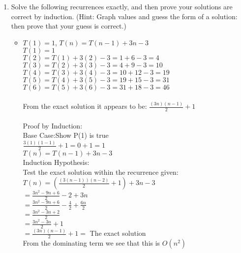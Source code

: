 \documentclass[11pt]{article}
\begin{document}
\begin{enumerate}
\item  Solve the following recurrences exactly, and then prove your solutions are correct by induction. (Hint:
Graph values and guess the form of a solution: then prove that your guess is correct.)
\begin {itemize}
\item $T(1) = 1$, $T(n) = T(n-1) + 3n-3$\\
$T(1) = 1$\\
$T(2) = T(1) +3(2)-3 = 1+6-3= 4$\\
$T(3) = T(2) + 3(3)-3=4+9-3=10$\\
$T(4) = T(3) + 3(4)-3=10+12-3=19$\\
$T(5) = T(4) + 3(5)-3=19+15-3=31$\\
$T(6) = T(5) + 3(6)-3=31+18-3=46$\\\\
From the exact solution it appears to be: $\frac{(3n)(n-1)}{2}+1$\\\\
Proof by Induction:\\
Base Case:Show P(1) is true\\
$\frac{3(1)(1-1)}{2}+1= 0+1=1$\\

$T(n) = T(n-1) + 3n-3$\\
Induction Hypothesis:\\
Test the exact solution within the recurrence given:\\
$T(n)=(\frac{(3(n-1))(n-2)}{2}+1) + 3n-3$\\
$=\frac{3n^2-9n+6}{2}-2+3n$\\
$=\frac{3n^2-9n+6}{2}-\frac{4}{2}+\frac{6n}{2}$\\
$=\frac{3n^2-3n+2}{2}$\\
$=\frac{3n^2-3n}{2}+1$\\
$=\frac{(3n)(n-1)}{2}+1=$ The exact solution\\
From the dominating term we see that this is $O(n^2)$


\end{itemize}
\end{enumerate}
\end{document}
